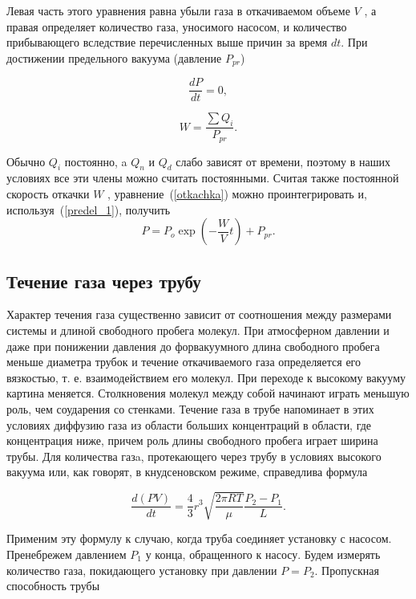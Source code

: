 \documentclass[a4paper,12pt]{article} %
\begin{document}
Левая часть этого уравнения равна убыли газа в откачиваемом объеме $V$ , а правая определяет количество газа, уносимого насосом, и количество прибывающего вследствие перечисленных выше причин
за время $dt$. При достижении предельного вакуума (давление $P_{pr}$)

\begin{equation}
\label{predel_1}
	\frac{dP}{dt}=0,
\end{equation}

\begin{equation}
\label{predel_2}
	W=\frac{\sum Q_i}{P_{pr}}.
\end{equation}

Обычно $Q_i$ постоянно, a $Q_n$ и $Q_d$ слабо зависят от времени, поэтому в наших условиях все эти члены можно считать постоянными. Считая также постоянной скорость откачки $W$ , уравнение~(\ref{otkachka}) можно проинтегрировать и, используя~(\ref{predel_1}), получить
\begin{equation}
\label{davlenie}
	P = P_o \exp{(-\frac{W}{V} t)} + P_{pr}.
\end{equation}

\subsection*{Течение газа через трубу}

Характер течения газа существенно зависит от соотношения между размерами системы и длиной свободного пробега молекул. При атмосферном давлении и даже при понижении давления до форвакуумного длина свободного пробега меньше диаметра трубок и течение откачиваемого газа определяется его вязкостью, т. е. взаимодействием его молекул. При переходе к высокому вакууму картина меняется. Столкновения молекул между собой начинают играть меньшую роль, чем соударения со стенками. Течение газа в трубе напоминает в этих условиях диффузию газа из области больших концентраций в области, где концентрация ниже, причем роль длины свободного пробега играет ширина трубы.
Для количества газa, протекающего через трубу в условиях высокого вакуума или, как говорят, в кнудсеновском режиме, справедлива формула

\begin{equation}
\label{formula}
	\frac{d(PV)}{dt}=\frac{4}{3}r^3 \sqrt{\frac{2\pi RT}{\mu}} \frac{P_2-P_1}{L}.
\end{equation}

Применим эту формулу к случаю, когда труба соединяет установку с насосом.
Пренебрежем давлением $P_1$ у конца, обращенного к насосу. Будем измерять количество газа, покидающего установку при давлении $P = P_2$. Пропускная способность трубы
\end{document}
